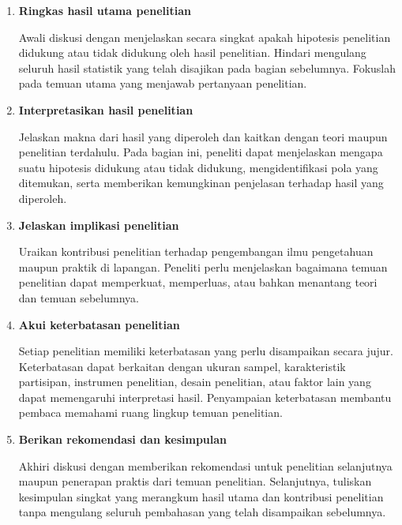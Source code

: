 \documentclass[
  indonesian,
  letterpaper,
  DIV=11,
  numbers=noendperiod]{scrreprt}
\begin{document}
\begin{enumerate}
\def\labelenumi{\arabic{enumi}.}
\item
  \textbf{Ringkas hasil utama penelitian}

  Awali diskusi dengan menjelaskan secara singkat apakah hipotesis
  penelitian didukung atau tidak didukung oleh hasil penelitian. Hindari
  mengulang seluruh hasil statistik yang telah disajikan pada bagian
  sebelumnya. Fokuslah pada temuan utama yang menjawab pertanyaan
  penelitian.
\item
  \textbf{Interpretasikan hasil penelitian}

  Jelaskan makna dari hasil yang diperoleh dan kaitkan dengan teori
  maupun penelitian terdahulu. Pada bagian ini, peneliti dapat
  menjelaskan mengapa suatu hipotesis didukung atau tidak didukung,
  mengidentifikasi pola yang ditemukan, serta memberikan kemungkinan
  penjelasan terhadap hasil yang diperoleh.
\item
  \textbf{Jelaskan implikasi penelitian}

  Uraikan kontribusi penelitian terhadap pengembangan ilmu pengetahuan
  maupun praktik di lapangan. Peneliti perlu menjelaskan bagaimana
  temuan penelitian dapat memperkuat, memperluas, atau bahkan menantang
  teori dan temuan sebelumnya.
\item
  \textbf{Akui keterbatasan penelitian}

  Setiap penelitian memiliki keterbatasan yang perlu disampaikan secara
  jujur. Keterbatasan dapat berkaitan dengan ukuran sampel,
  karakteristik partisipan, instrumen penelitian, desain penelitian,
  atau faktor lain yang dapat memengaruhi interpretasi hasil.
  Penyampaian keterbatasan membantu pembaca memahami ruang lingkup
  temuan penelitian.
\item
  \textbf{Berikan rekomendasi dan kesimpulan}

  Akhiri diskusi dengan memberikan rekomendasi untuk penelitian
  selanjutnya maupun penerapan praktis dari temuan penelitian.
  Selanjutnya, tuliskan kesimpulan singkat yang merangkum hasil utama
  dan kontribusi penelitian tanpa mengulang seluruh pembahasan yang
  telah disampaikan sebelumnya.
\end{enumerate}
\end{document}
